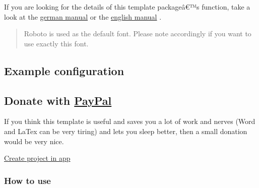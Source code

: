 If you are looking for the details of this template packageâ€™s
function, take a look at the
\href{https://github.com/typst/packages/raw/main/packages/preview/aio-studi-and-thesis/0.1.0/docs/manual-de.pdf}{german
manual} or the
\href{https://github.com/typst/packages/raw/main/packages/preview/aio-studi-and-thesis/0.1.0/docs/manual-en.pdf}{english
manual} .

\begin{quote}
Roboto is used as the default font. Please note accordingly if you want
to use exactly this font.
\end{quote}

\subsection{Example configuration}\label{example-configuration}

\begin{Shaded}
\begin{Highlighting}[]

\NormalTok{  ),}
\NormalTok{  )}
\NormalTok{)}
\end{Highlighting}
\end{Shaded}

\subsection{\texorpdfstring{Donate with
\href{https://www.paypal.com/donate/?hosted_button_id=4G9X8TDNYYNKG}{PayPal}}{Donate with PayPal}}\label{donate-with-paypal}

If you think this template is useful and saves you a lot of work and
nerves (Word and LaTex can be very tiring) and lets you sleep better,
then a small donation would be very nice.

\href{https://www.paypal.com/donate/?hosted_button_id=4G9X8TDNYYNKG}{}

\href{/app?template=aio-studi-and-thesis&version=0.1.0}{Create project
in app}

\subsubsection{How to use}\label{how-to-use}

